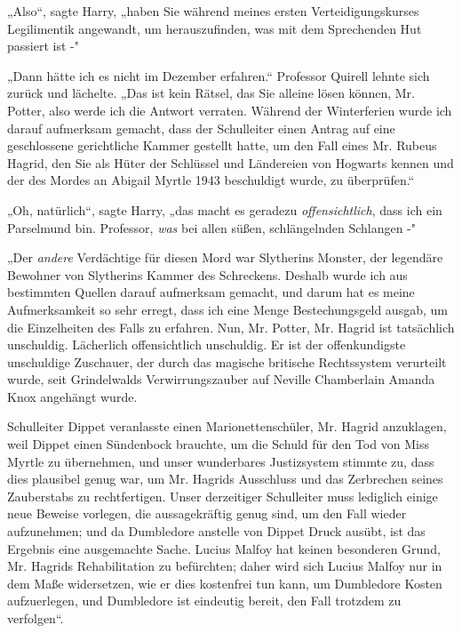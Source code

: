 {„Also“, sagte Harry, „haben Sie während meines ersten Verteidigungskurses Legilimentik angewandt, um herauszufinden, was mit dem Sprechenden Hut passiert ist -"

„Dann hätte ich es nicht im Dezember erfahren.“ Professor Quirell lehnte sich zurück und lächelte. „Das ist kein Rätsel, das Sie alleine lösen können, Mr. Potter, also werde ich die Antwort verraten. Während der Winterferien wurde ich darauf aufmerksam gemacht, dass der Schulleiter einen Antrag auf eine geschlossene gerichtliche Kammer gestellt hatte, um den Fall eines Mr. Rubeus Hagrid, den Sie als Hüter der Schlüssel und Ländereien von Hogwarts kennen und der des Mordes an Abigail Myrtle 1943 beschuldigt wurde, zu überprüfen.“

„Oh, natürlich“, sagte Harry, „das macht es geradezu \emph{offensichtlich}, dass ich ein Parselmund bin. Professor, \emph{was} bei allen süßen, schlängelnden Schlangen -"

„Der \emph{andere} Verdächtige für diesen Mord war Slytherins Monster, der legendäre Bewohner von Slytherins Kammer des Schreckens. Deshalb wurde ich aus bestimmten Quellen darauf aufmerksam gemacht, und darum hat es meine Aufmerksamkeit so sehr erregt, dass ich eine Menge Bestechungsgeld ausgab, um die Einzelheiten des Falls zu erfahren. Nun, Mr. Potter, Mr. Hagrid ist tatsächlich unschuldig. Lächerlich offensichtlich unschuldig. Er ist der offenkundigste unschuldige Zuschauer, der durch das magische britische Rechtssystem verurteilt wurde, seit Grindelwalds Verwirrungszauber auf Neville Chamberlain Amanda Knox angehängt wurde.

Schulleiter Dippet veranlasste einen Marionettenschüler, Mr. Hagrid anzuklagen, weil Dippet einen Sündenbock brauchte, um die Schuld für den Tod von Miss Myrtle zu übernehmen, und unser wunderbares Justizsystem stimmte zu, dass dies plausibel genug war, um Mr. Hagrids Ausschluss und das Zerbrechen seines Zauberstabs zu rechtfertigen. Unser derzeitiger Schulleiter muss lediglich einige neue Beweise vorlegen, die aussagekräftig genug sind, um den Fall wieder aufzunehmen; und da Dumbledore anstelle von Dippet Druck ausübt, ist das Ergebnis eine ausgemachte Sache. Lucius Malfoy hat keinen besonderen Grund, Mr. Hagrids Rehabilitation zu befürchten; daher wird sich Lucius Malfoy nur in dem Maße widersetzen, wie er dies kostenfrei tun kann, um Dumbledore Kosten aufzuerlegen, und Dumbledore ist eindeutig bereit, den Fall trotzdem zu verfolgen“.

}
